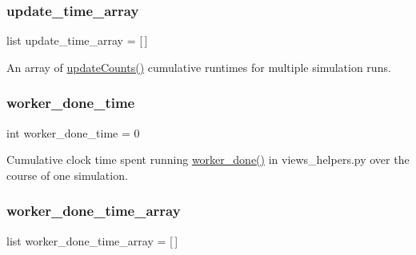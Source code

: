 \subsubsection{\texorpdfstring{update\_time\_array}{update\_time\_array}}
{\footnotesize\ttfamily list update\+\_\+time\+\_\+array = \mbox{[}$\,$\mbox{]}\hspace{0.3cm}{\ttfamily [static]}}



An array of \mbox{\hyperlink{namespacedynamicfilterapp_1_1views__helpers_a57d6ebd6f2f99cba59b82eded490891f}{update\+Counts()}} cumulative runtimes for multiple simulation runs. 

\mbox{\label{classdynamicfilterapp_1_1test__simulations_1_1_simulation_test_ab6da582941b08e9341e17555b8862fbd}} 
\subsubsection{\texorpdfstring{worker\_done\_time}{worker\_done\_time}}
{\footnotesize\ttfamily int worker\+\_\+done\+\_\+time = 0\hspace{0.3cm}{\ttfamily [static]}}



Cumulative clock time spent running \mbox{\hyperlink{namespacedynamicfilterapp_1_1views__helpers_af27860dfe5bfa6b2b8a1b29347eb918d}{worker\+\_\+done()}} in views\+\_\+helpers.\+py over the course of one simulation. 

\mbox{\label{classdynamicfilterapp_1_1test__simulations_1_1_simulation_test_afaec525ce73afa412628498ba8603b65}} 
\subsubsection{\texorpdfstring{worker\_done\_time\_array}{worker\_done\_time\_array}\hspace{0.1cm}{\footnotesize\ttfamily [1/2]}}
{\footnotesize\ttfamily list worker\+\_\+done\+\_\+time\+\_\+array = \mbox{[}$\,$\mbox{]}\hspace{0.3cm}{\ttfamily [static]}}



